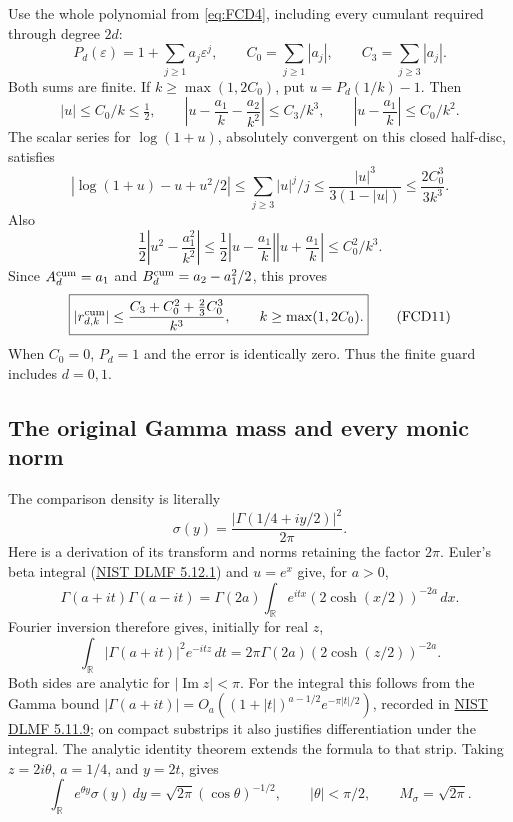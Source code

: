Use the whole polynomial from \eqref{eq:FCD4}, including every
cumulant required through degree \(2d\):
\[
 P_d(\varepsilon)=1+\sum_{j\ge1}a_j\varepsilon^j,\qquad
 C_0=\sum_{j\ge1}|a_j|,\qquad C_3=\sum_{j\ge3}|a_j|.
\]
Both sums are finite. If \(k\ge\max(1,2C_0)\), put
\(u=P_d(1/k)-1\). Then
\[
 |u|\le C_0/k\le\tfrac12,\qquad
 \left|u-\frac{a_1}k-\frac{a_2}{k^2}\right|
       \le C_3/k^3,\qquad
 \left|u-\frac{a_1}k\right|\le C_0/k^2 .
\]
The scalar series for \(\log(1+u)\), absolutely convergent on this
closed half-disc, satisfies
\[
 |\log(1+u)-u+u^2/2|
   \le\sum_{j\ge3}|u|^j/j
   \le\frac{|u|^3}{3(1-|u|)}
   \le\frac{2C_0^3}{3k^3}.
\]
Also
\[
 \frac12\left|u^2-\frac{a_1^2}{k^2}\right|
 \le\frac12\left|u-\frac{a_1}k\right|
                  \left|u+\frac{a_1}k\right|
 \le C_0^2/k^3 .
\]
Since \(A_d^{\rm cum}=a_1\) and
\(B_d^{\rm cum}=a_2-a_1^2/2\), this proves
\begin{equation}
 \boxed{\displaystyle
 |r_{d,k}^{\rm cum}|
 \le \frac{C_3+C_0^2+\tfrac23 C_0^3}{k^3},
 \qquad k\ge\max(1,2C_0).}
 \tag{FCD11}\label{eq:FCD11}
\end{equation}
When \(C_0=0\), \(P_d=1\) and the error is identically zero.
Thus the finite guard includes \(d=0,1\).

\subsection{The original Gamma mass and every monic norm}

The comparison density is literally
\[
 \sigma(y)=\frac{|\Gamma(1/4+iy/2)|^2}{2\pi}.
\]
Here is a derivation of its transform and norms retaining the factor
\(2\pi\). Euler's beta integral
(\href{https://dlmf.nist.gov/5.12.E1}{NIST DLMF 5.12.1})
and \(u=e^x\) give, for \(a>0\),
\[
 \Gamma(a+it)\Gamma(a-it)
   =\Gamma(2a)\int_{\mathbb R}
           e^{itx}(2\cosh(x/2))^{-2a}\,dx.
\]
Fourier inversion therefore gives, initially for real \(z\),
\[
 \int_{\mathbb R}|\Gamma(a+it)|^2e^{-itz}\,dt
        =2\pi\Gamma(2a)(2\cosh(z/2))^{-2a}.
\]
Both sides are analytic for \(|\operatorname{Im}z|<\pi\).
For the integral this follows from the Gamma bound
\(|\Gamma(a+it)|=O_a((1+|t|)^{a-1/2}e^{-\pi|t|/2})\),
recorded in
\href{https://dlmf.nist.gov/5.11.E9}{NIST DLMF 5.11.9};
on compact substrips it also justifies differentiation under the integral.
The analytic identity theorem extends the formula to that strip.
Taking \(z=2i\theta\), \(a=1/4\), and \(y=2t\), gives
\begin{equation}
 \int_{\mathbb R}e^{\theta y}\sigma(y)\,dy
       =\sqrt{2\pi}(\cos\theta)^{-1/2},\qquad
 |\theta|<\pi/2,\qquad M_\sigma=\sqrt{2\pi}.
 \tag{FCD12}\label{eq:FCD12}
\end{equation}

